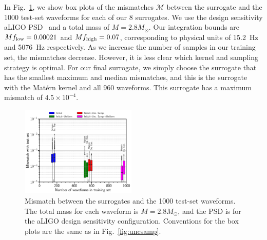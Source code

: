 \documentclass[prd,aps,letter,twocolumn,floatfix,notitlepage,nofootinbib]{revtex4-1}
\begin{document}
In Fig.~\ref{fig:mismatch}, we show box plots of the mismatches $\mathcal{M}$ between the surrogate and the 1000 test-set waveforms for each of our 8 surrogates. We use the design sensitivity aLIGO PSD~\cite{Aasi:2013wya} and a total mass of $M=2.8M_\odot$. Our integration bounds are $Mf_{\rm low} = 0.00021$ and $Mf_{\rm high} = 0.07$, corresponding to physical units of 15.2~Hz and 5076~Hz respectively. As we increase the number of samples in our training set, the mismatches decrease. However, it is less clear which kernel and sampling strategy is optimal. For our final surrogate, we simply choose the surrogate that has the smallest maximum and median mismatches, and this is the surrogate with the Mat\'{e}rn kernel and all 960 waveforms. This surrogate has a maximum mismatch of $4.5\times 10^{-4}$. 

\begin{figure}[htb]
\centering
\includegraphics[width=0.49\textwidth]{mismatch.pdf}
\caption{
Mismatch between the surrogates and the 1000 test-set waveforms. The total mass for each waveform is $M=2.8M_\odot$, and the PSD is for the aLIGO design sensitivity configuration. Conventions for the box plots are the same as in Fig.~\ref{fig:uncsamp}.
}
\label{fig:mismatch}
\end{figure}
\end{document}
